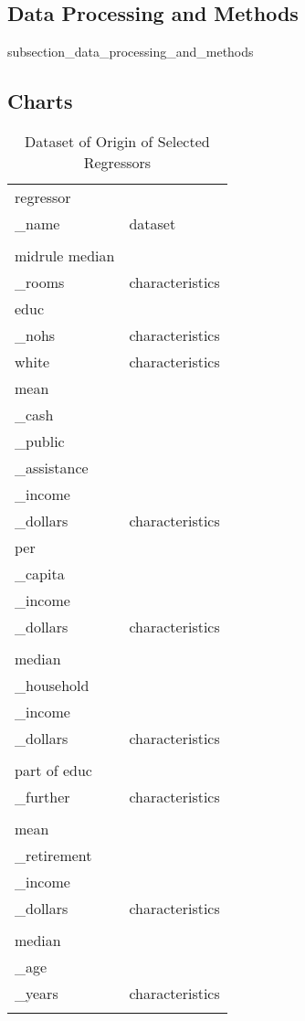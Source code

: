 \subsection{Data Processing and Methods}{subsection_data_processing_and_methods}

\subsection{Charts}

\begin{table}
    \centering
    \caption{Dataset of Origin of Selected Regressors}
    \label{regressor_origin}
    \begin{tabular}{ll}
    \toprule
    regressor\\_name &          dataset \\
    \\midrule
    median\\_rooms &  characteristics \\
    educ\\_nohs &  characteristics \\
    white &  characteristics \\
    mean\\_cash\\_public\\_assistance\\_income\\_dollars &  characteristics \\
    per\\_capita\\_income\\_dollars &  characteristics \\\\
    median\\_household\\_income\\_dollars &  characteristics \\\\
    part of educ\\_further &  characteristics \\\\
    mean\\_retirement\\_income\\_dollars &  characteristics \\\\
    median\\_age\\_years &  characteristics \\\\

\end{tabular}
\end{table}
